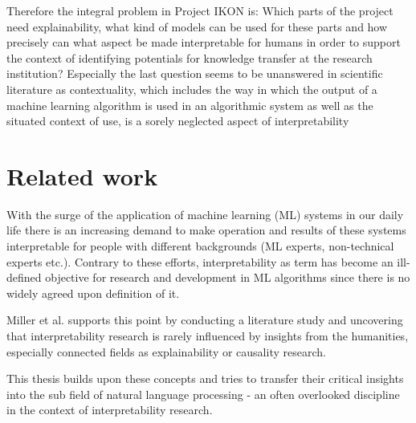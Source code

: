 \documentclass[pdftex,a4paper,12pt]{scrartcl}
\begin{document}
Therefore the integral problem in Project IKON is: Which parts of the project need explainability, what kind of models can be used for these parts and how precisely can what aspect be made interpretable for humans in order to support the context of identifying potentials for knowledge transfer at the research institution? Especially the last question seems to be unanswered in scientific literature as contextuality, which includes the way in which the output of a machine learning algorithm is used in an algorithmic system as well as the situated context of use, is a sorely neglected aspect of interpretability \cite{millerExplanationArtificialIntelligence2017}

\section{Related work}

With the surge of the application of machine learning (ML) systems in our daily life there is an increasing demand to make operation and results of these systems interpretable for people with different backgrounds (ML experts, non-technical experts etc.). Contrary to these efforts, interpretability as term has become an ill-defined objective \cite{liptonMythosModelInterpretability2016}  for research and development in ML algorithms since there is no widely agreed upon definition of it. 

Miller et al. \cite{millerExplainableAIBeware2017} supports this point by conducting a literature study and uncovering that interpretability research is rarely influenced by insights from the humanities, especially connected fields as explainability or causality research.

This thesis builds upon these concepts  and tries to transfer their critical insights into the sub field of natural language processing - an often overlooked discipline in the context of interpretability research.
\end{document}
